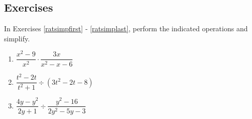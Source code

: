 \documentclass[10pt]{article}
\begin{document}
\begin{ex}
\begin{enumerate}












\end{enumerate}

\end{ex}

\newpage

\subsection{Exercises}

In Exercises \ref{ratsimpfirst} - \ref{ratsimplast}, perform the indicated operations and simplify.

\begin{multicols}{3}
\begin{enumerate}

\item $\dfrac{x^2-9}{x^2} \cdot \dfrac{3x}{x^2-x-6}$\label{ratsimpfirst}
\item $\dfrac{t^2-2t}{t^2+1} \div (3t^2 - 2t - 8)$
\item $\dfrac{4y-y^2}{2y+1} \div \dfrac{y^2-16}{2y^2-5y-3}$

\setcounter{HW}{\value{enumi}}
\end{enumerate}
\end{multicols}
\end{document}
